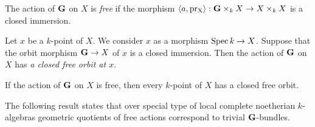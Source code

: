 \begin{definition}
The action of $\mathbf{G}$ on $X$ is \textit{free} if the morphism $\langle a, \mathrm{pr_X} \rangle:\mathbf{G}\times_kX\rightarrow X\times_kX$ is a closed immersion.
\end{definition}

\begin{definition}
Let $x$ be a $k$-point of $X$. We consider $x$ as a morphism $\mathrm{Spec}\, k\rightarrow X$. Suppose that the orbit morphism $\mathbf{G}\rightarrow X$ of $x$ is a closed immersion. Then the action of $\mathbf{G}$ on $X$ has \textit{a closed free orbit at $x$}.
\end{definition}

\begin{fact}\label{fact:all_k_points_have_free_closed_orbit_for_free_actions}
If the action of $\mathbf{G}$ on $X$ is free, then every $k$-point of $X$ has a closed free orbit.
\end{fact}
\noindent
The following result states that over special type of local complete noetherian $k$-algebras geometric quotients of free actions correspond to trivial $\mathbf{G}$-bundles. 

